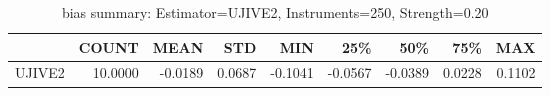 \begin{table}[ht]
\centering
\caption{bias summary: Estimator=UJIVE2, Instruments=250, Strength=0.20}
\begin{tabular}{lrrrrrrrr}
\toprule
 & COUNT & MEAN & STD & MIN & 25\% & 50\% & 75\% & MAX \\
\midrule
UJIVE2 & 10.0000 & -0.0189 & 0.0687 & -0.1041 & -0.0567 & -0.0389 & 0.0228 & 0.1102 \\
\bottomrule
\end{tabular}
\end{table}
